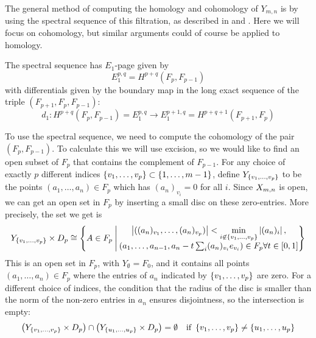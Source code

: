 The general method of computing the homology and cohomology of
$Y_{m,n}$ is by using the spectral sequence of this
filtration, as described in \cite{hatcherss} and
\cite{mccleary}. Here we will focus on
cohomology, but similar arguments could of course be applied to
homology.

The spectral sequence has $E_1$-page given by
\[ E_1^{p,q} = H^{p+q}(F_p,F_{p-1}) \]
with differentials given by the boundary map in the long exact
sequence of the triple $(F_{p+1},F_p,F_{p-1})$:
\[ d_1 : H^{p+q}(F_p,F_{p-1}) = E_1^{p,q} \to E_1^{p+1,q} =
H^{p+q+1}(F_{p+1},F_p) \]

To use the spectral sequence, we need to compute the cohomology of the
pair $(F_p,F_{p-1})$. To calculate this we will use excision, so we
would like to find an open subset of $F_p$ that contains the
complement of $F_{p-1}$. For any choice of exactly $p$ 
different indices $\left\{ v_1,\dots,v_p \right\}\subset \left\{ 1,\dots,m-1 \right\}$,
define $Y_{\left\{ v_1,\dots,v_p \right\}}$ to be the points $(a_1,\dots,a_n)\in
F_p$ which has $(a_n)_{v_i} = 0$ for all $i$. Since $X_{m,n}$ is open, we
can get an open set in $F_p$ by inserting a small disc on these
zero-entries. More precisely, the set we get is
\[ Y_{\left\{ v_1,\dots,v_p \right\}} \times D_p \cong \left\{  A\in F_p \:\Bigg\vert\: 
  \begin{matrix} \displaystyle 
    \left| ((a_n)_{v_1},\dots,(a_n)_{v_p}) \right| <
    \min_{i\not\in \left\{ v_1,\dots,v_p \right\}} \left| (a_n)_i \right|, \\
    \left(a_1,\dots,a_{n-1},a_n-t\sum_{i} (a_n)_{v_i}e_{v_i}\right)\in
    F_p \forall t \in [0,1]
  \end{matrix}  \right\} \]
This is an open set in $F_p$, with $Y_{\emptyset} = F_0$, and it
contains all points $(a_1,\dots,a_n)\in F_p$ where the entries of
$a_n$ indicated by $\left\{ v_1,\dots,v_p \right\}$ are zero. For a different
choice of indices, the condition that the radius of the disc is
smaller than the norm of the non-zero entries in $a_n$ ensures
disjointness, so the intersection is empty:
\[ \left(Y_{\left\{ v_1,\dots,v_p \right\}}\times D_p\right) \cap \left(
  Y_{\left\{ u_1,\dots,u_p \right\}}\times D_p\right) = \emptyset \quad \text{if }
\left\{ v_1,\dots,v_p \right\} \neq \left\{ u_1,\dots,u_p \right\} \]

